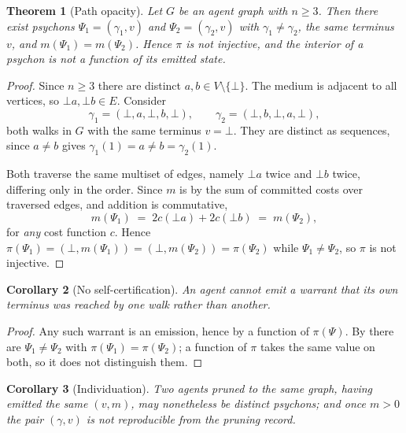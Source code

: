 \documentclass[11pt,a4paper]{article}
\theoremstyle{clstyle}
\newtheorem{theorem}{Theorem}[section]
\newtheorem{corollary}[theorem]{Corollary}
\theoremstyle{definition}
\theoremstyle{remark}
\newcommand{\rec}{m}
\newcommand{\Psy}{\Psi}                  %
\newcommand{\traj}{\gamma}               %
\newcommand{\term}{v}                    %
\newcommand{\med}{\bot}                  %
\begin{document}
\begin{theorem}[Path opacity]
\label{thm:opacity}
Let $G$ be an agent graph with $n\ge3$. Then there exist psychons
$\Psy_1=(\traj_1,\term)$ and $\Psy_2=(\traj_2,\term)$ with
$\traj_1\neq\traj_2$, the same terminus $\term$, and
$\rec(\Psy_1)=\rec(\Psy_2)$. Hence $\pi$ is not injective, and the interior
of a psychon is not a function of its emitted state.
\end{theorem}

\begin{proof}
Since $n\ge3$ there are distinct $a,b\in V\setminus\{\med\}$. The medium is
adjacent to all vertices, so $\med a,\med b\in E$. Consider
\begin{equation}
\traj_1=(\med,a,\med,b,\med),\qquad \traj_2=(\med,b,\med,a,\med),
\end{equation}
both walks in $G$ with the same terminus $\term=\med$. They are distinct as
sequences, since $a\neq b$ gives $\traj_1(1)=a\neq b=\traj_2(1)$.

Both traverse the same multiset of edges, namely $\med a$ twice and $\med b$
twice, differing only in the order. Since $\rec$ is by  the
sum of committed costs over traversed edges, and addition is commutative,
\begin{equation}
\rec(\Psy_1) \;=\; 2c(\med a)+2c(\med b) \;=\; \rec(\Psy_2),
\end{equation}
for \emph{any} cost function $c$. Hence
$\pi(\Psy_1)=(\med,\rec(\Psy_1))=(\med,\rec(\Psy_2))=\pi(\Psy_2)$ while
$\Psy_1\neq\Psy_2$, so $\pi$ is not injective.
\end{proof}

\begin{corollary}[No self-certification]
\label{cor:noselfcert}
An agent cannot emit a warrant that its own terminus was reached by one walk
rather than another.
\end{corollary}

\begin{proof}
Any such warrant is an emission, hence by  a function of
$\pi(\Psy)$. By  there are $\Psi_1\neq\Psi_2$ with
$\pi(\Psy_1)=\pi(\Psy_2)$; a function of $\pi$ takes the same value on both,
so it does not distinguish them.
\end{proof}

\begin{corollary}[Individuation]
\label{cor:individuation}
Two agents pruned to the same graph, having emitted the same
$(\term,\rec)$, may nonetheless be distinct psychons; and once
$\rec>0$ the pair $(\traj,\term)$ is not reproducible from the pruning
record.
\end{corollary}
\end{document}
